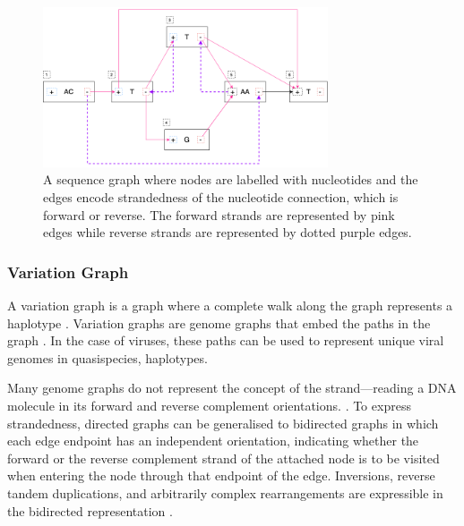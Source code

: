 \documentclass[10pt, a4paper]{article}
\begin{document}
\begin{figure}[h]
\centering
\includegraphics[width=0.75\textwidth]{../Figures/sequence-graph.png}
\caption[Sequence Graph]{\label{fig:org42e6263}A sequence graph where nodes are labelled with nucleotides and the edges encode strandedness of the nucleotide connection, which is forward or reverse. The forward strands are represented by pink edges while reverse strands are represented by dotted purple edges.}
\end{figure}

\subsubsection{Variation Graph}
\label{sec:org3f895bc}
A variation graph is a graph where a complete walk along the graph represents a
haplotype \cite{patenGenomeGraphsEvolution2017}. Variation graphs are genome
graphs that embed the paths in the graph .
In the case of viruses, these paths can be used to represent unique viral
genomes in quasispecies, haplotypes. 

Many genome graphs do not represent the concept of the strand—reading a DNA
molecule in its forward and reverse complement orientations.
\cite{patenGenomeGraphsEvolution2017}. To express strandedness, directed graphs
can be generalised to bidirected graphs
\cite{edmondsMatchingWellSolvedClass2003,medvedevComputationalMethodsDiscovering2009}
in which each edge endpoint has an independent orientation, indicating whether
the forward or the reverse complement strand of the attached node is to be
visited when entering the node through that endpoint of the edge. Inversions,
reverse tandem duplications, and arbitrarily complex rearrangements are
expressible in the bidirected representation \cite{patenGenomeGraphsEvolution2017}.


\end{document}
